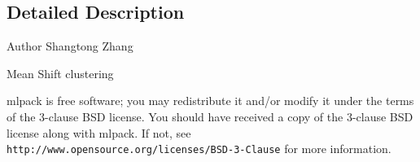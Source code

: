 \subsection{Detailed Description}
\begin{DoxyAuthor}{Author}
Shangtong Zhang
\end{DoxyAuthor}
Mean Shift clustering

mlpack is free software; you may redistribute it and/or modify it under the terms of the 3-\/clause B\+SD license. You should have received a copy of the 3-\/clause B\+SD license along with mlpack. If not, see {\tt http\+://www.\+opensource.\+org/licenses/\+B\+S\+D-\/3-\/\+Clause} for more information. 